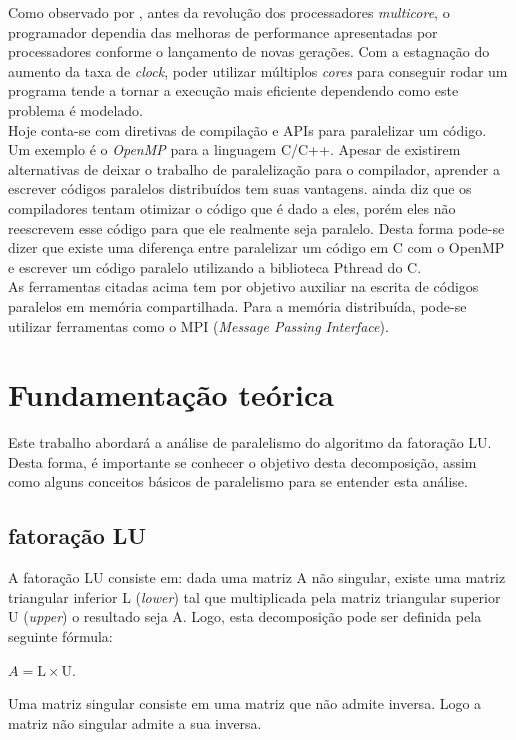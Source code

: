 \documentclass[12pt]{article}
\newcommand\tab[1][1cm]{\hspace*{#1}}
\begin{document}
\tab Como observado por \cite{aubanel:1606499}, antes da revolução dos processadores \textit{multicore}, o programador dependia das melhoras de performance apresentadas por processadores conforme o lançamento de novas gerações. Com a estagnação do aumento da taxa de \textit{clock}, poder utilizar múltiplos \textit{cores}  para conseguir rodar um programa tende a tornar a execução mais eficiente dependendo como este problema é modelado.
\\
\tab Hoje conta-se com diretivas de compilação e APIs para paralelizar um código. Um exemplo é o \textit{OpenMP} para a linguagem C/C++. Apesar de existirem alternativas de deixar o trabalho de paralelização para o compilador, aprender a escrever códigos paralelos distribuídos tem suas vantagens. \cite{aubanel:1606499} ainda diz que os compiladores tentam otimizar o código que é dado a eles, porém eles não reescrevem esse código para que ele realmente seja paralelo. Desta forma pode-se dizer que existe uma diferença entre paralelizar um código em C com o OpenMP e escrever um código paralelo utilizando a biblioteca Pthread do C.
\\
\tab As ferramentas citadas acima tem por objetivo auxiliar na escrita de códigos paralelos em memória compartilhada. Para a memória distribuída, pode-se utilizar ferramentas como o MPI (\textit{Message Passing Interface}).

\section{Fundamentação teórica} \label{sec:fund}

\tab Este trabalho abordará a análise de paralelismo do algoritmo da fatoração LU. Desta forma, é importante se conhecer o objetivo desta decomposição, assim como alguns conceitos básicos de paralelismo para se entender esta análise. 

\subsection{fatoração LU}\label{subsec:lu}
\tab A fatoração LU consiste em: dada uma matriz A não singular, existe uma matriz triangular inferior L (\textit{lower}) tal que multiplicada pela matriz triangular superior U (\textit{upper}) o resultado seja A. Logo, esta decomposição pode ser definida pela seguinte fórmula: 
\begin{center}
$A = \text{L} \times \text{U}$.
\end{center}
\tab Uma matriz singular consiste em uma matriz que não admite inversa. Logo a matriz não singular admite a sua inversa.
\end{document}
